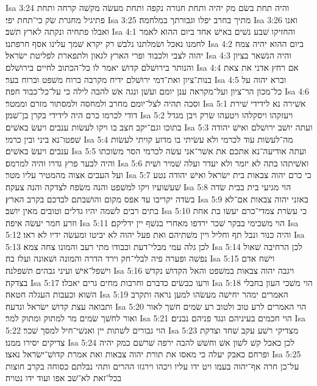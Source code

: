 Isa 3:24  והיה תחת בשׂם מק יהיה ותחת חגורה נקפה ותחת מעשׂה מקשׁה קרחה ותחת פתיגיל מחגרת שׂק כי־תחת יפי׃
Isa 3:25  מתיך בחרב יפלו וגבורתך במלחמה׃
Isa 3:26  ואנו ואבלו פתחיה ונקתה לארץ תשׁב׃
Isa 4:1  והחזיקו שׁבע נשׁים באישׁ אחד ביום ההוא לאמר לחמנו נאכל ושׂמלתנו נלבשׁ רק יקרא שׁמך עלינו אסף חרפתנו׃
Isa 4:2  ביום ההוא יהיה צמח יהוה לצבי ולכבוד ופרי הארץ לגאון ולתפארת לפליטת ישׂראל׃
Isa 4:3  והיה הנשׁאר בציון והנותר בירושׁלם קדושׁ יאמר לו כל־הכתוב לחיים בירושׁלם׃
Isa 4:4  אם רחץ אדני את צאת בנות־ציון ואת־דמי ירושׁלם ידיח מקרבה ברוח משׁפט וברוח בער׃
Isa 4:5  וברא יהוה על כל־מכון הר־ציון ועל־מקראה ענן יומם ועשׁן ונגה אשׁ להבה לילה כי על־כל־כבוד חפה׃
Isa 4:6  וסכה תהיה לצל־יומם מחרב ולמחסה ולמסתור מזרם וממטר׃
Isa 5:1  אשׁירה נא לידידי שׁירת דודי לכרמו כרם היה לידידי בקרן בן־שׁמן׃
Isa 5:2  ויעזקהו ויסקלהו ויטעהו שׂרק ויבן מגדל בתוכו וגם־יקב חצב בו ויקו לעשׂות ענבים ויעשׂ באשׁים׃
Isa 5:3  ועתה יושׁב ירושׁלם ואישׁ יהודה שׁפטו־נא ביני ובין כרמי׃
Isa 5:4  מה־לעשׂות עוד לכרמי ולא עשׂיתי בו מדוע קויתי לעשׂות ענבים ויעשׂ באשׁים׃
Isa 5:5  ועתה אודיעה־נא אתכם את אשׁר־אני עשׂה לכרמי הסר משׂוכתו והיה לבער פרץ גדרו והיה למרמס׃
Isa 5:6  ואשׁיתהו בתה לא יזמר ולא יעדר ועלה שׁמיר ושׁית ועל העבים אצוה מהמטיר עליו מטר׃
Isa 5:7  כי כרם יהוה צבאות בית ישׂראל ואישׁ יהודה נטע שׁעשׁועיו ויקו למשׁפט והנה משׂפח לצדקה והנה צעקה׃
Isa 5:8  הוי מגיעי בית בבית שׂדה בשׂדה יקריבו עד אפס מקום והושׁבתם לבדכם בקרב הארץ׃
Isa 5:9  באזני יהוה צבאות אם־לא בתים רבים לשׁמה יהיו גדלים וטובים מאין יושׁב׃
Isa 5:10  כי עשׂרת צמדי־כרם יעשׂו בת אחת וזרע חמר יעשׂה איפה׃
Isa 5:11  הוי משׁכימי בבקר שׁכר ירדפו מאחרי בנשׁף יין ידליקם׃
Isa 5:12  והיה כנור ונבל תף וחליל ויין משׁתיהם ואת פעל יהוה לא יביטו ומעשׂה ידיו לא ראו׃
Isa 5:13  לכן גלה עמי מבלי־דעת וכבודו מתי רעב והמונו צחה צמא׃
Isa 5:14  לכן הרחיבה שׁאול נפשׁה ופערה פיה לבלי־חק וירד הדרה והמונה ושׁאונה ועלז בה׃
Isa 5:15  וישׁח אדם וישׁפל־אישׁ ועיני גבהים תשׁפלנה׃
Isa 5:16  ויגבה יהוה צבאות במשׁפט והאל הקדושׁ נקדשׁ בצדקה׃
Isa 5:17  ורעו כבשׂים כדברם וחרבות מחים גרים יאכלו׃
Isa 5:18  הוי משׁכי העון בחבלי השׁוא וכעבות העגלה חטאה׃
Isa 5:19  האמרים ימהר יחישׁה מעשׂהו למען נראה ותקרב ותבואה עצת קדושׁ ישׂראל ונדעה׃
Isa 5:20  הוי האמרים לרע טוב ולטוב רע שׂמים חשׁך לאור ואור לחשׁך שׂמים מר למתוק ומתוק למר׃
Isa 5:21  הוי חכמים בעיניהם ונגד פניהם נבנים׃
Isa 5:22  הוי גבורים לשׁתות יין ואנשׁי־חיל למסך שׁכר׃
Isa 5:23  מצדיקי רשׁע עקב שׁחד וצדקת צדיקים יסירו ממנו׃
Isa 5:24  לכן כאכל קשׁ לשׁון אשׁ וחשׁשׁ להבה ירפה שׁרשׁם כמק יהיה ופרחם כאבק יעלה כי מאסו את תורת יהוה צבאות ואת אמרת קדושׁ־ישׂראל נאצו׃
Isa 5:25  על־כן חרה אף־יהוה בעמו ויט ידו עליו ויכהו וירגזו ההרים ותהי נבלתם כסוחה בקרב חוצות בכל־זאת לא־שׁב אפו ועוד ידו נטויה׃
